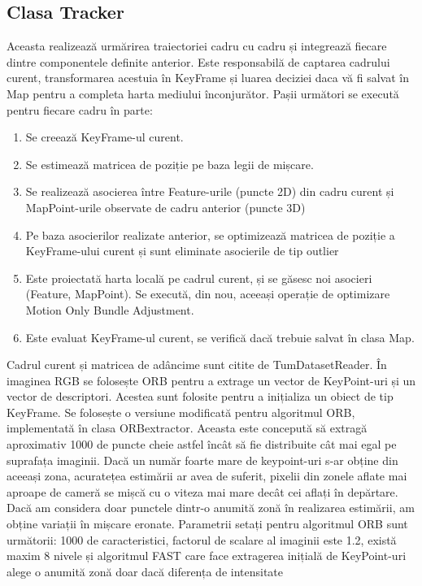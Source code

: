 \documentclass[12pt,a4paper]{report}
\begin{document}
\subsection{Clasa Tracker}
Aceasta realizează urmărirea traiectoriei cadru cu cadru și integrează 
fiecare dintre componentele definite anterior. Este responsabilă de captarea cadrului curent,
transformarea acestuia în KeyFrame și luarea deciziei daca vă fi salvat în Map pentru a completa 
harta mediului înconjurător. Pașii următori se execută pentru fiecare cadru în parte:
\begin{enumerate}
    \item Se creează KeyFrame-ul curent.
    \item Se estimează matricea de poziție pe baza legii de mișcare.
    \item Se realizează asocierea între Feature-urile (puncte 2D) din cadru curent și 
MapPoint-urile observate de cadru anterior (puncte 3D)
    \item Pe baza asocierilor realizate anterior, se optimizează matricea de poziție
a KeyFrame-ului curent și sunt eliminate asocierile de tip outlier
    \item Este proiectată harta locală pe cadrul curent, și se găsesc noi asocieri 
(Feature, MapPoint). Se execută, din nou, aceeași operație de optimizare Motion Only Bundle Adjustment.
    \item Este evaluat KeyFrame-ul curent, se verifică dacă trebuie salvat în clasa Map. 
\end{enumerate}
Cadrul curent și matricea de adâncime sunt citite de TumDatasetReader. În imaginea RGB 
se folosește ORB pentru a extrage un vector de KeyPoint-uri și un vector de descriptori. 
Acestea sunt folosite pentru a inițializa un obiect de tip KeyFrame. Se 
folosește o versiune modificată pentru algoritmul ORB, implementată în clasa ORBextractor. Aceasta 
este concepută să extragă aproximativ 1000 de puncte cheie astfel încât să fie distribuite cât mai egal pe suprafața imaginii. 
Dacă un număr foarte mare de keypoint-uri s-ar obține din aceeași zona, acuratețea estimării ar 
avea de suferit, pixelii din zonele aflate mai aproape de cameră se mișcă cu o viteza mai mare 
decât cei aflați în depărtare. Dacă am considera doar punctele dintr-o anumită zonă în realizarea
estimării, am obține variații în mișcare eronate. Parametrii setați pentru algoritmul ORB sunt următorii: 
1000 de caracteristici, factorul de scalare al imaginii este 1.2, există maxim 8 nivele și algoritmul FAST care face 
extragerea inițială de KeyPoint-uri alege o anumită  zonă doar dacă diferența de intensitate
\end{document}
